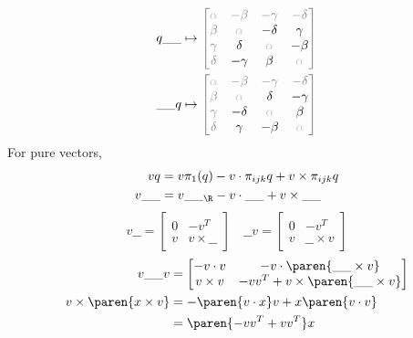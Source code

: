 \documentclass[draft]{scrartcl}
\newcommand{\black}[1]{{\color{black}{#1}}}
\renewcommand{\blank}{\_\_}
\begin{document}
\begin{multicols*}{2}
  \newcommand{\lightgray}[1]{{\color{lightgray}#1}}
  \begin{align*}
    q \blank  &\mapsto
                \color{gray}
    \begin{bmatrix}
      \lightgray\alpha & - \beta & -\gamma & -\delta  \\
      \beta & \lightgray\alpha   & \black{-\delta} & \black{\gamma} \\
      \gamma & \black{\delta} & \lightgray\alpha & \black{-\beta}  \\
      \delta & \black{-\gamma} & \black\beta & \lightgray\alpha
    \end{bmatrix} \\
     \blank q  &\mapsto
                \color{gray}
    \begin{bmatrix}
      \lightgray\alpha & - \beta & -\gamma & -\delta  \\
      \beta & \lightgray\alpha   & \black{\delta} & \black{-\gamma} \\
      \gamma & \black{-\delta} & \lightgray\alpha & \black{\beta}  \\
      \delta & \black{\gamma} & \black{-\beta} & \lightgray\alpha
    \end{bmatrix}
  \end{align*}
  For pure vectors,
  \begin{align*}
    v q &= v\pi_{1}(q) -v\cdot \pi_{ijk} q + v\times \pi_{ijk} q \\
    v\blank &= v\blank_{\R} - v\cdot\blank + v\times\blank
  \end{align*}
  \[
    v\blank =
    \begin{bmatrix}
      0 & -v^T \\
      v & v\times\blank
    \end{bmatrix}
    \quad
    \blank v =
    \begin{bmatrix}
      0 & -v^T \\
      v & \blank\times v
    \end{bmatrix}
  \]
  \begin{align*}
    v\blank v &=
    \begin{bmatrix}
      -v\cdot v & -v\cdot \paren{\blank\times v} \\
      v\times v & -vv^T+ v\times \paren{\blank\times v}
    \end{bmatrix} \\
    v\times\paren{x\times v} &= -\paren{v\cdot x} v + x\paren{v\cdot v} \\
    &= \paren{-vv^T+ vv^T}x \\

\end{align*}
\end{multicols*}
\end{document}

